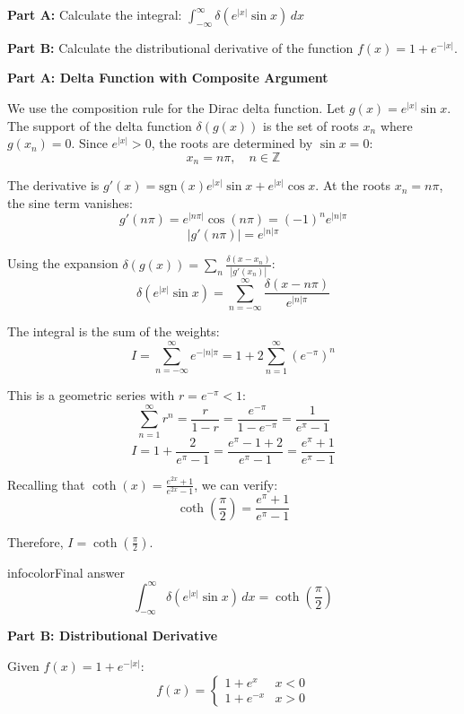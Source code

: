 \documentclass[a4paper,11pt]{article} %
\newenvironment{summarybox}[1][]{\begin{custombox}[#1]{infocolor}{Final answer}}{\end{custombox}}
\begin{document}
\begin{problembox}
\textbf{Part A:} Calculate the integral:
$\int_{-\infty}^{\infty} \delta(e^{|x|} \sin x) \, dx$

\textbf{Part B:} Calculate the distributional derivative of the function $f(x) = 1 + e^{-|x|}$.
\end{problembox}

\textbf{Part A: Delta Function with Composite Argument}

We use the composition rule for the Dirac delta function. Let $g(x) = e^{|x|} \sin x$.
The support of the delta function $\delta(g(x))$ is the set of roots $x_n$ where $g(x_n) = 0$.
Since $e^{|x|} > 0$, the roots are determined by $\sin x = 0$:
$$ x_n = n\pi, \quad n \in \mathbb{Z} $$

The derivative is $g'(x) = \text{sgn}(x) e^{|x|} \sin x + e^{|x|} \cos x$.
At the roots $x_n = n\pi$, the sine term vanishes:
$$ g'(n\pi) = e^{|n\pi|} \cos(n\pi) = (-1)^n e^{|n|\pi} $$
$$ |g'(n\pi)| = e^{|n|\pi} $$

Using the expansion $\delta(g(x)) = \sum_n \frac{\delta(x - x_n)}{|g'(x_n)|}$:
$$ \delta(e^{|x|} \sin x) = \sum_{n=-\infty}^{\infty} \frac{\delta(x - n\pi)}{e^{|n|\pi}} $$

The integral is the sum of the weights:
$$ I = \sum_{n=-\infty}^{\infty} e^{-|n|\pi} = 1 + 2\sum_{n=1}^{\infty} (e^{-\pi})^n $$

This is a geometric series with $r = e^{-\pi} < 1$:
$$ \sum_{n=1}^{\infty} r^n = \frac{r}{1-r} = \frac{e^{-\pi}}{1 - e^{-\pi}} = \frac{1}{e^{\pi} - 1} $$
$$ I = 1 + \frac{2}{e^{\pi} - 1} = \frac{e^{\pi} - 1 + 2}{e^{\pi} - 1} = \frac{e^{\pi} + 1}{e^{\pi} - 1} $$

Recalling that $\coth(x) = \frac{e^{2x} + 1}{e^{2x} - 1}$, we can verify:
$$ \coth\left(\frac{\pi}{2}\right) = \frac{e^{\pi} + 1}{e^{\pi} - 1} $$

Therefore, $I = \coth\left(\frac{\pi}{2}\right)$.

\begin{summarybox}[title={Part A Answer}]
$$ \int_{-\infty}^{\infty} \delta(e^{|x|} \sin x) \, dx = \coth\left(\frac{\pi}{2}\right) $$
\end{summarybox}

\textbf{Part B: Distributional Derivative}

Given $f(x) = 1 + e^{-|x|}$:
$$ f(x) = \begin{cases} 1 + e^x & x < 0 \\ 1 + e^{-x} & x > 0 \end{cases} $$
\end{document}
